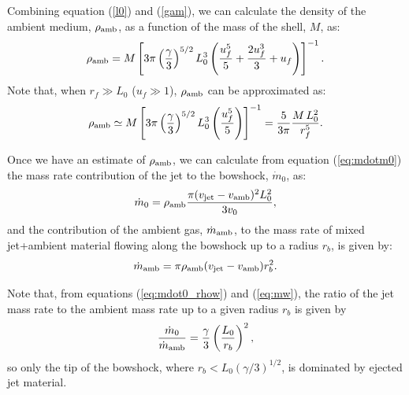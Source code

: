 \documentclass[12pt]{mythesis}
\begin{document}

Combining equation (\ref{l0}) and (\ref{gam}), 
we can calculate the density of the ambient medium, $\rho_{\rm amb}$, as a function of the mass of the shell, $M$, as:
\begin{equation}\label{eq:rhow_mr}
 \rho_{\rm amb} = M \left[3\pi \left(\frac{\gamma}{3}\right)^{5/2} L_0^3 
 \left(\frac{u_f^5}{5} + \frac{2u_f^3}{3} + u_f\right)\right]^{-1}.
\end{equation}
Note that, when $r_{f}\gg L_0$ ($u_f\gg 1$), $\rho_{\rm amb}$ can be approximated as:
\begin{equation}
	\rho_{\rm amb} \simeq M \left[3\pi \left(\frac{\gamma}{3}\right)^{5/2} L_0^3 \left(\frac{u_f^5}{5}\right)\right]^{-1} = \frac{5}{3\pi} \frac{M\, L_0^2}{r_{f}^5}. %
\end{equation}

Once we have an estimate of $\rho_{\rm amb}$, we can calculate from equation (\ref{eq:mdotm0}) the mass rate contribution of the jet to the bowshock, $\dot{m}_0$, as:
\begin{equation}\label{eq:mdot0_rhow}
	\dot{m}_0 = \rho_{\rm amb}\frac{\pi (v_{\rm jet}-v_{\rm amb})^2L_0^2}{3v_0},
\end{equation}
and the contribution of the ambient gas, $\dot{m}_{\rm amb}$, to the mass rate of mixed jet+ambient material flowing along the bowshock up to a radius $r_b$, is given by:
\begin{equation}\label{eq:mw}
	\dot{m}_{\rm amb} = \pi \rho_{\rm amb} (v_{\rm jet}-v_{\rm amb}) r_b^2.
\end{equation}

Note that, from equations (\ref{eq:mdot0_rhow}) and (\ref{eq:mw}), the ratio of the jet mass rate to the ambient mass rate up to a given radius $r_b$ is given by
\begin{equation}
	\frac{\dot{m}_0}{\dot{m}_{\rm amb}} = \frac{\gamma}{3}\left(\frac{L_0}{r_b}\right)^2,
\end{equation}
so only the tip of the bowshock, where $r_b<L_0 (\gamma/3)^{1/2}$, is dominated by ejected jet material. 
\end{document}
